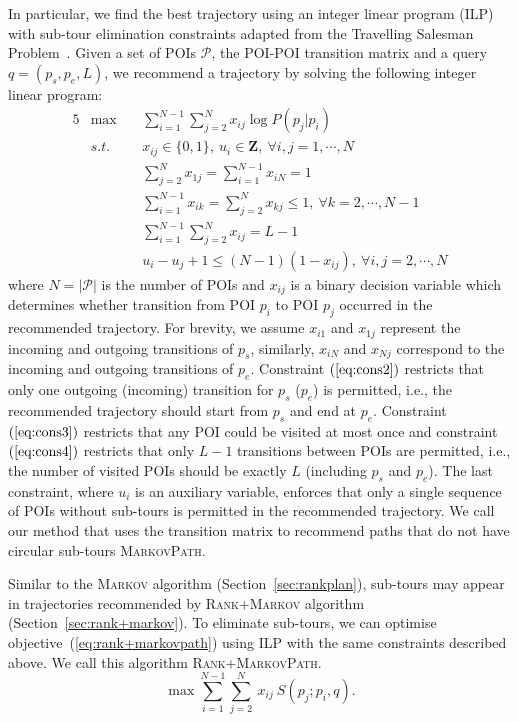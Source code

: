 In particular, we find the best trajectory using an integer linear program (ILP) with
sub-tour elimination constraints adapted from the Travelling Salesman Problem~\cite{opt98}.
Given a set of POIs $\mathcal{P}$, the POI-POI transition matrix and a query $q = (p_s, p_e, L)$,
we recommend a trajectory by solving the following integer linear program:
\begin{alignat}{5}
& \max ~&& \sum_{i=1}^{N-1} \sum_{j=2}^N x_{ij} \log P(p_j | p_i)                            \nonumber \\
& s.t. ~&& x_{ij} \in \{0, 1\}, ~u_i \in \mathbf{Z},            ~\forall i, j = 1, \cdots, N \label{eq:cons1} \\
&       && \sum_{j=2}^N x_{1j} = \sum_{i=1}^{N-1} x_{iN} = 1                                 \label{eq:cons2} \\
&       && \sum_{i=1}^{N-1} x_{ik} = \sum_{j=2}^N x_{kj} \le 1, ~\forall k=2, \cdots, N-1    \label{eq:cons3} \\
&       && \sum_{i=1}^{N-1} \sum_{j=2}^N x_{ij} = L-1                                        \label{eq:cons4} \\
&       && u_i - u_j + 1 \le (N-1) (1-x_{ij}),                  ~\forall i, j = 2, \cdots, N \label{eq:cons5}
\end{alignat}
where $N=|\mathcal{P}|$ is the number of POIs and $x_{ij}$ is a binary decision variable 
which determines whether transition from POI $p_i$ to POI $p_j$ occurred in the recommended trajectory.
For brevity, we assume $x_{i1}$ and $x_{1j}$ represent the incoming and outgoing transitions of $p_s$,
similarly, $x_{iN}$ and $x_{Nj}$ correspond to the incoming and outgoing transitions of $p_e$.
Constraint $(\ref{eq:cons2})$ restricts that only one outgoing (incoming) transition for $p_s$ ($p_e$) is permitted, 
i.e., the recommended trajectory should start from $p_s$ and end at $p_e$.
Constraint $(\ref{eq:cons3})$ restricts that any POI could be visited at most once and 
constraint $(\ref{eq:cons4})$ restricts that only $L-1$ transitions between POIs are permitted, 
i.e., the number of visited POIs should be exactly $L$ (including $p_s$ and $p_e$).
The last constraint, where $u_i$ is an auxiliary variable, 
enforces that only a single sequence of POIs without sub-tours is permitted in the recommended trajectory.
We call our method that uses the transition matrix to recommend paths that do not have circular sub-tours \textsc{MarkovPath}.


Similar to the \textsc{Markov} algorithm (Section~\ref{sec:rankplan}),
sub-tours may appear in trajectories recommended by \textsc{Rank+Markov} algorithm (Section~\ref{sec:rank+markov}).
To eliminate sub-tours, we can optimise objective~(\ref{eq:rank+markovpath}) using ILP with the same constraints described above.
We call this algorithm \textsc{Rank+MarkovPath}.
\begin{equation}
\label{eq:rank+markovpath}
\max \sum_{i=1}^{N-1} \sum_{j=2}^N ~x_{ij} ~S(p_j; p_i, q).
\end{equation}
